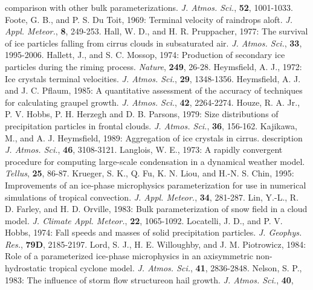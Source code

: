       comparison with other bulk parameterizations.
      {\it J. Atmos. Sci.},
      {\bf 52},
      1001-1033.
\decrefname
Foote, G. B., and P. S. Du Toit, 1969:
      Terminal velocity of raindrops aloft.
      {\it J. Appl. Meteor.},
      {\bf 8},
      249-253.
\decrefname
Hall, W. D., and H. R. Pruppacher, 1977:
      The survival of ice particles falling from cirrus clouds in subsaturated
      air.
      {\it J. Atmos. Sci.},
      {\bf 33},
      1995-2006.
\decrefname
Hallett, J., and S. C. Mossop, 1974:
      Production of secondary ice particles during the riming process.
      {\it Nature},
      {\bf 249},
      26-28.
\decrefname
Heymsfield, A. J., 1972:
      Ice crystals terminal velocities.
      {\it J. Atmos. Sci.},
      {\bf 29},
      1348-1356.
\decrefname
Heymsfield, A. J. and J. C. Pflaum, 1985:
      A quantitative assessment of the accuracy of techniques for calculating
      graupel growth.
      {\it J. Atmos. Sci.},
      {\bf 42},
      2264-2274.
\decrefname
Houze, R. A. Jr., P. V. Hobbs, P. H. Herzegh and D. B. Parsons, 1979:
      Size distributions of precipitation particles in frontal clouds.
      {\it J. Atmos. Sci.},
      {\bf 36},
      156-162.
\decrefname
Kajikawa, M., and A. J. Heymsfield, 1989:
      Aggregation of ice crystals in cirrus.
      description
      {\it J. Atmos. Sci.},
      {\bf 46},
      3108-3121.
\decrefname
Langlois, W. E., 1973:
      A rapidly convergent procedure for computing large-scale condensation in
      a dynamical weather model.
      {\it Tellus},
      {\bf 25},
      86-87.
\decrefname
Krueger, S. K., Q. Fu, K. N. Liou, and H.-N. S. Chin, 1995:
      Improvements of an ice-phase microphysics parameterization for use in
      numerical simulations of tropical convection.
      {\it J. Appl. Meteor.},
      {\bf 34},
      281-287.
\decrefname
Lin, Y.-L., R. D. Farley, and H. D. Orville, 1983:
      Bulk parameterization of snow field in a cloud model.
      {\it J. Climate Appl. Meteor.},
      {\bf 22},
      1065-1092.
\decrefname
Locatelli, J. D., and P. V. Hobbs, 1974:
      Fall speeds and masses of solid precipitation particles.
      {\it J. Geophys. Res.},
      {\bf 79D},
      2185-2197.
\decrefname
Lord, S. J., H. E. Willoughby, and J. M. Piotrowicz, 1984:
      Role of a parameterized ice-phase microphysics in an axisymmetric
      non-hydrostatic tropical  cyclone model.
      {\it J. Atmos. Sci.},
      {\bf 41},
      2836-2848.
\decrefname
Nelson, S. P., 1983:
      The influence of storm flow structureon hail growth.
      {\it J. Atmos. Sci.},
      {\bf 40},
